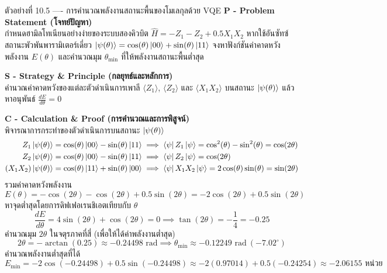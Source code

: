 \begin{psctbox}{ตัวอย่างที่ 10.5 ---- การคำนวณพลังงานสถานะพื้นของโมเลกุลด้วย VQE}
\noindent\textbf{P - Problem Statement (โจทย์ปัญหา)} \\
กำหนดฮามิลโทเนียนอย่างง่ายของระบบสองคิวบิต $\hat{H} = -Z_1 - Z_2 + 0.5 X_1 X_2$ หากใช้อันซัทซ์สถานะพัวพันพารามิเตอร์เดี่ยว $\ket{\psi(\theta)} = \cos(\theta)\ket{00} + \sin(\theta)\ket{11}$ จงหาฟังก์ชันค่าคาดหวังพลังงาน $E(\theta)$ และคำนวณมุม $\theta_{\text{min}}$ ที่ให้พลังงานสถานะพื้นต่ำสุด

\vspace{4pt}
\noindent\textbf{S - Strategy \& Principle (กลยุทธ์และหลักการ)} \\
คำนวณค่าคาดหวังของแต่ละตัวดำเนินการเพาลี $\langle Z_1 \rangle$, $\langle Z_2 \rangle$ และ $\langle X_1 X_2 \rangle$ บนสถานะ $\ket{\psi(\theta)}$ แล้วหาอนุพันธ์ $\frac{dE}{d\theta} = 0$

\vspace{4pt}
\noindent\textbf{C - Calculation \& Proof (การคำนวณและการพิสูจน์)} \\
พิจารณาการกระทำของตัวดำเนินการบนสถานะ $\ket{\psi(\theta)}$
\begin{align}
Z_1 \ket{\psi(\theta)} &= \cos(\theta)\ket{00} - \sin(\theta)\ket{11} \implies \bra{\psi}Z_1\ket{\psi} = \cos^2(\theta) - \sin^2(\theta) = \cos(2\theta) \\
Z_2 \ket{\psi(\theta)} &= \cos(\theta)\ket{00} - \sin(\theta)\ket{11} \implies \bra{\psi}Z_2\ket{\psi} = \cos(2\theta) \\
(X_1 X_2) \ket{\psi(\theta)} &= \cos(\theta)\ket{11} + \sin(\theta)\ket{00} \implies \bra{\psi}X_1 X_2\ket{\psi} = 2\cos(\theta)\sin(\theta) = \sin(2\theta)
\end{align}
รวมค่าคาดหวังพลังงาน
\begin{equation}
E(\theta) = -\cos(2\theta) - \cos(2\theta) + 0.5\sin(2\theta) = -2\cos(2\theta) + 0.5\sin(2\theta)
\end{equation}
หาจุดต่ำสุดโดยการดิฟเฟอเรนชิเอตเทียบกับ $\theta$
\begin{equation}
\frac{dE}{d\theta} = 4\sin(2\theta) + \cos(2\theta) = 0 \implies \tan(2\theta) = -\frac{1}{4} = -0.25
\end{equation}
คำนวณมุม $2\theta$ ในจตุรภาคที่สี่ (เพื่อให้ได้ค่าพลังงานต่ำสุด)
\begin{equation}
2\theta = -\arctan(0.25) \approx -0.24498\text{ rad} \implies \theta_{\text{min}} \approx -0.12249\text{ rad} \ (-7.02^\circ)
\end{equation}
คำนวณพลังงานต่ำสุดที่ได้
\begin{equation}
E_{\text{min}} = -2\cos(-0.24498) + 0.5\sin(-0.24498) \approx -2(0.97014) + 0.5(-0.24254) \approx -2.06155\text{ หน่วย}
\end{equation}


\end{psctbox}
